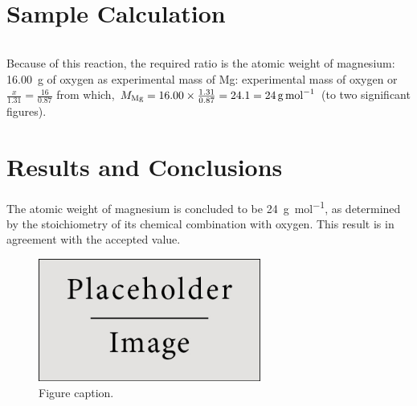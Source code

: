 \documentclass{article}
\begin{document}
\section{Sample Calculation}

\begin{tabular}{ll}
\end{tabular}

Because of this reaction, the required ratio is the atomic weight of magnesium: \SI{16.00}{\gram} of oxygen as experimental mass of Mg: experimental mass of oxygen or $\frac{x}{1.31}=\frac{16}{0.87}$ from which, $M_{\ce{Mg}} = 16.00 \times \frac{1.31}{0.87} = 24.1 = \SI{24}{\gram\per\mole}$ (to two significant figures).


\section{Results and Conclusions}

The atomic weight of magnesium is concluded to be \SI{24}{\gram\per\mol}, as determined by the stoichiometry of its chemical combination with oxygen. This result is in agreement with the accepted value.

\begin{figure}[h]
\begin{center}
\includegraphics[width=0.65\textwidth]{placeholder} %
\caption{Figure caption.}
\end{center}
\end{figure}
\end{document}
